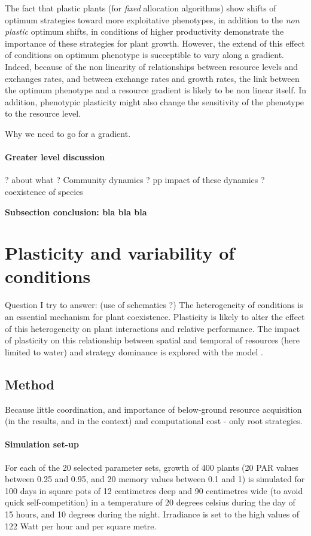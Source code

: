 The fact that plastic plants (for \textit{fixed} allocation algorithms) show shifts of optimum strategies toward more exploitative phenotypes, in addition to the \textit{non plastic} optimum shifts, in conditions of higher productivity demonstrate the importance of these strategies for plant growth. However, the extend of this effect of conditions on optimum phenotype is succeptible to vary along a gradient. Indeed, because of the non linearity of relationships between resource levels and exchanges rates, and between exchange rates and growth rates, the link between the optimum phenotype and a resource gradient is likely to be non linear itself. In addition, phenotypic plasticity might also change the sensitivity of the phenotype to the resource level.

Why we need to go for a gradient.

\paragraph{Greater level discussion}
? about what ? Community dynamics ? pp impact of these dynamics ? coexistence of species


\textbf{Subsection conclusion: bla bla bla}


\section{Plasticity and variability of conditions}
Question I try to answer: (use of schematics ?)
The heterogeneity of conditions is an essential mechanism for plant coexistence. Plasticity is likely to alter the effect of this heterogeneity on plant interactions and relative performance. The impact of plasticity on this relationship between spatial and temporal  of resources (here limited to water) and strategy dominance is explored with the model \model.

\subsection{Method}

Because little coordination, and importance of below-ground resource acquisition (in the results, and in the context) and computational cost - only root strategies.

\paragraph{Simulation set-up}
For each of the 20 selected parameter sets, growth of 400 plants (20 PAR values between 0.25 and 0.95, and 20 memory values between 0.1 and 1) is simulated for 100 days in square pots of 12 centimetres deep and 90 centimetres wide (to avoid quick self-competition) in a temperature of 20 degrees celsius during the day of 15 hours, and 10 degrees during the night. Irradiance is set to the high values of 122 Watt per hour and per square metre. 

